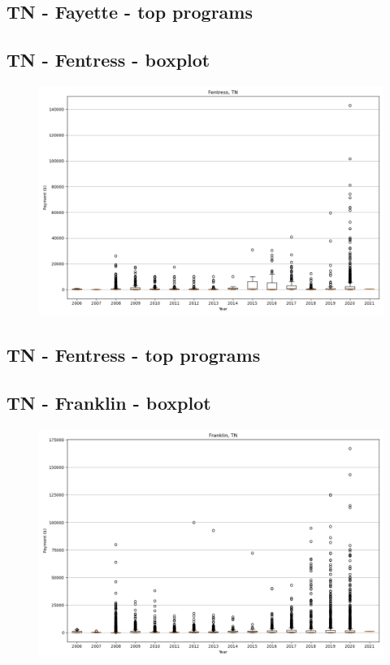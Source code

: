 \subsection*{TN - Fayette - top programs}

\newpage
\subsection*{TN - Fentress - boxplot}
\begin{figure}[h]
\centering
\includegraphics[width=7in]{../output/boxplots/counties/Fentress-TN_boxplot.png}
\end{figure}


\subsection*{TN - Fentress - top programs}

\newpage
\subsection*{TN - Franklin - boxplot}
\begin{figure}[h]
\centering
\includegraphics[width=7in]{../output/boxplots/counties/Franklin-TN_boxplot.png}
\end{figure}


